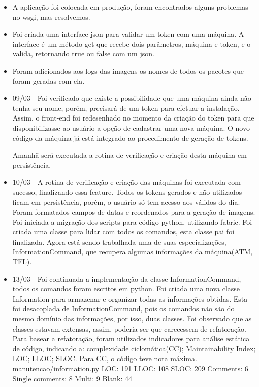 \begin{itemize}
    \item A aplicação foi colocada em produção, foram encontrados alguns problemas no wsgi, mas resolvemos.

    \item Foi criada uma interface json para validar um token com uma máquina. A interface é um método get que recebe dois parâmetros, máquina e token, e o valida, retornando true ou false com um json.

    \item Foram adicionados aos logs das imagens os nomes de todos os pacotes que foram geradas com ela.


    \item 09/03 -
  Foi verificado que existe a possibilidade que uma máquina ainda não tenha seu nome, porém, precisará de um token para efetuar a instalação. Assim, o front-end foi redesenhado no momento da criação do token para que disponibilizasse ao usuário a opção de cadastrar uma nova máquina. O novo código da máquina já está integrado ao procedimento de geração de tokens.

  Amanhã será executada a rotina de verificação e criação desta máquina em persistência.


    \item 10/03 -
  A rotina de verificação e criação das máquinas foi executada com sucesso, finalizando essa feature.
  Todos os tokens gerados e não utilizados ficam em persistência, porém, o usuário só tem acesso aos válidos do dia.
  Foram formatados campos de datas e reordenados para a geração de imagens.
  Foi iniciada a migração dos scripts para código python, utilizando fabric. Foi criada uma classe para lidar com todos os comandos, esta classe pai foi finalizada. Agora está sendo trabalhada uma de suas especializações, InformationCommand, que recupera algumas informações da máquina(ATM, TFL).


    \item 13/03 -
  Foi continuada a implementação da classe InformationCommand, todos os comandos foram escritos em python. Foi criada uma nova classe Information para armazenar e organizar todas as informações obtidas. Esta foi desacoplada de InformationCommand, pois os comandos não são do mesmo domínio das informações, por isso, duas classes.
  Foi observado que as classes estavam extensas, assim, poderia ser que carecessem de refatoração. Para basear a refatoração, foram utilizados indicadores para análise estática de código, indicando a: complexidade ciclomática(CC); Maintainability Index; LOC; LLOC; SLOC.
  Para CC, o código teve nota máxima.
  manutencao/information.py
  LOC: 191
  LLOC: 108
  SLOC: 209
  Comments: 6
  Single comments: 8
  Multi: 9
  Blank: 44


\end{itemize}
